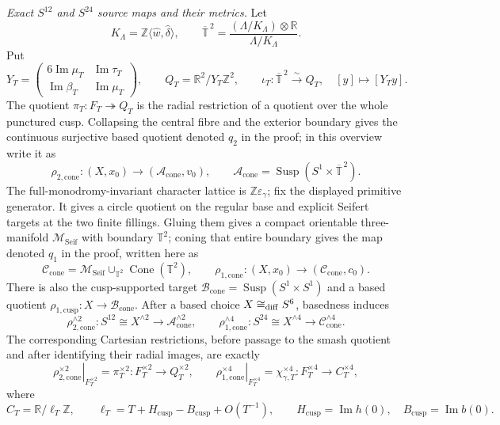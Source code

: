 \documentclass[10pt,letterpaper]{article}
\begin{document}
\medskip\noindent
\textit{Exact $S^{12}$ and $S^{24}$ source maps and their metrics.}
Let
\[
 K_\Lambda=\mathbb Z\langle\widehat w,\widehat\delta\rangle,
 \qquad \overline{\mathbb T}^{\,2}=
 \frac{(\Lambda/K_\Lambda)\otimes\mathbb R}{\Lambda/K_\Lambda}.
\]
Put
\[
 Y_T=
 \begin{pmatrix}
  6\operatorname{Im}\mu_T&\operatorname{Im}\tau_T\\
  \operatorname{Im}\beta_T&\operatorname{Im}\mu_T
 \end{pmatrix},\qquad
 Q_T=\mathbb R^2/Y_T\mathbb Z^2,\qquad
 \iota_T:\overline{\mathbb T}^{\,2}\xrightarrow{\sim}Q_T,
 \quad[y]\longmapsto[Y_Ty].
\]
The quotient $\pi_T:F_T\twoheadrightarrow Q_T$ is the radial restriction
of a quotient over the whole punctured cusp.  Collapsing the central fibre
and the exterior boundary gives the continuous surjective based quotient
denoted $q_2$ in the proof; in this overview write it as
\[
 \rho_{2,\mathrm{cone}}:(X,x_0)\longrightarrow
 (\mathcal A_{\mathrm{cone}},v_0),\qquad
 \mathcal A_{\mathrm{cone}}
 =\operatorname{Susp}(S^1\times\overline{\mathbb T}^{\,2}).
\]
The full-monodromy-invariant character lattice is
$\mathbb Z\varepsilon_\gamma$; fix the displayed primitive generator.  It
gives a circle quotient on the regular base and explicit Seifert targets at
the two finite fillings.  Gluing them gives a compact orientable
three-manifold $\mathcal M_{\mathrm{Seif}}$ with boundary $\mathbb T^2$;
coning that entire boundary gives the map denoted $q_1$ in the proof,
written here as
\[
 \mathcal C_{\mathrm{cone}}=
 \mathcal M_{\mathrm{Seif}}\cup_{\mathbb T^2}
 \operatorname{Cone}(\mathbb T^2),\qquad
 \rho_{1,\mathrm{cone}}:(X,x_0)\longrightarrow
 (\mathcal C_{\mathrm{cone}},c_0).
\]
There is also the cusp-supported target
$\mathcal B_{\mathrm{cone}}=\operatorname{Susp}(S^1\times S^1)$ and a
based quotient $\rho_{1,\mathrm{cusp}}:X\to\mathcal B_{\mathrm{cone}}$.
After a based choice $X\cong_{\rm diff}S^6$, basedness induces
\[
 \rho_{2,\mathrm{cone}}^{\wedge2}:
 S^{12}\cong X^{\wedge2}\longrightarrow
 \mathcal A_{\mathrm{cone}}^{\wedge2},
 \qquad
 \rho_{1,\mathrm{cone}}^{\wedge4}:
 S^{24}\cong X^{\wedge4}\longrightarrow
 \mathcal C_{\mathrm{cone}}^{\wedge4}.
\]
The corresponding Cartesian restrictions, before passage to the smash
quotient and after identifying their radial images, are exactly
\[
 \left.\rho_{2,\mathrm{cone}}^{\times2}\right|_{F_T^{\times2}}
 =\pi_T^{\times2}:F_T^{\times2}\to Q_T^{\times2},
 \qquad
 \left.\rho_{1,\mathrm{cone}}^{\times4}\right|_{F_T^{\times4}}
 =\chi_{\gamma,T}^{\times4}:F_T^{\times4}\to C_T^{\times4},
\]
where
\[
 C_T=\mathbb R/\ell_T\mathbb Z,\qquad
 \ell_T=T+H_{\mathrm{cusp}}-B_{\mathrm{cusp}}+O(T^{-1}),\qquad
 H_{\mathrm{cusp}}=\operatorname{Im}h(0),\quad
 B_{\mathrm{cusp}}=\operatorname{Im}b(0).
\]
\end{document}
